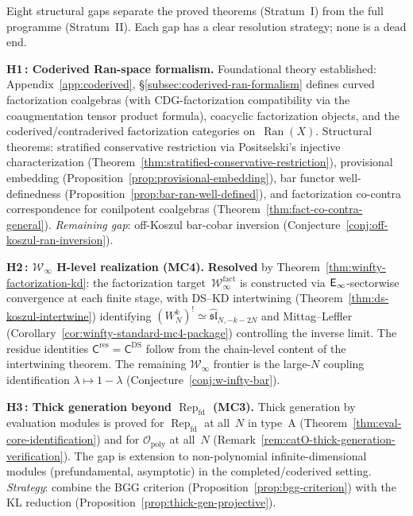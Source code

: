 \begin{remark}\label{rem:structural-gaps}
Eight structural gaps separate the proved theorems
(Stratum~I) from the full programme (Stratum~II).
Each gap has a clear resolution strategy; none is a dead end.

\smallskip\noindent
\textbf{H1\,: Coderived Ran-space formalism.}
Foundational theory established:
Appendix~\ref{app:coderived},
\S\ref{subsec:coderived-ran-formalism} defines curved
factorization coalgebras (with CDG-factorization compatibility
via the coaugmentation tensor product formula), coacyclic
factorization objects, and the coderived/contraderived
factorization categories on~$\operatorname{Ran}(X)$.  Structural
theorems: stratified conservative restriction via Positselski's
injective characterization
(Theorem~\ref{thm:stratified-conservative-restriction}),
provisional embedding
(Proposition~\ref{prop:provisional-embedding}), bar functor
well-definedness
(Proposition~\ref{prop:bar-ran-well-defined}), and factorization
co-contra correspondence for conilpotent coalgebras
(Theorem~\ref{thm:fact-co-contra-general}).
\emph{Remaining gap}: off-Koszul bar-cobar inversion
(Conjecture~\ref{conj:off-koszul-ran-inversion}).

\smallskip\noindent
\textbf{H2\,: $\mathcal{W}_\infty$ H-level realization (MC4).}
\textbf{Resolved} by Theorem~\ref{thm:winfty-factorization-kd}: the
factorization target~$\mathcal{W}_\infty^{\mathrm{fact}}$ is
constructed via $\mathsf{E}_{\infty}$-sectorwise convergence at each finite
stage, with DS--KD intertwining
(Theorem~\ref{thm:ds-koszul-intertwine}) identifying
$(W_N^k)^! \simeq \widehat{\mathfrak{sl}}_{N,-k-2N}$ and
Mittag--Leffler
(Corollary~\ref{cor:winfty-standard-mc4-package}) controlling the
inverse limit.  The residue identities
$\mathsf{C}^{\mathrm{res}} = \mathsf{C}^{\mathrm{DS}}$ follow
from the chain-level content of the intertwining theorem.
The remaining $\mathcal{W}_\infty$ frontier is the large-$N$
coupling identification $\lambda \mapsto 1 - \lambda$
(Conjecture~\ref{conj:w-infty-bar}).

\smallskip\noindent
\textbf{H3\,: Thick generation beyond $\operatorname{Rep}_{\mathrm{fd}}$ (MC3).}
Thick generation by evaluation modules is proved for
$\operatorname{Rep}_{\mathrm{fd}}$
at all~$N$ in type~A
(Theorem~\ref{thm:eval-core-identification}) and for
$\mathcal{O}_{\mathrm{poly}}$ at all~$N$
(Remark~\ref{rem:catO-thick-generation-verification}).
The gap is extension to non-polynomial infinite-dimensional modules
(prefundamental, asymptotic) in the completed/coderived setting.
\emph{Strategy}: combine the BGG criterion
(Proposition~\ref{prop:bgg-criterion}) with the KL reduction
(Proposition~\ref{prop:thick-gen-projective}).


\end{remark}
